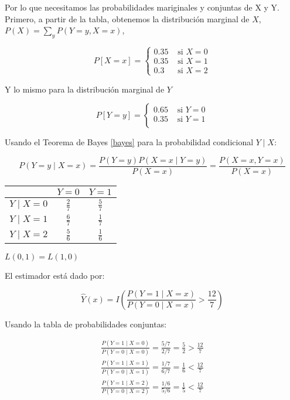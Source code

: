 \documentclass[letter, 11pt, twoside]{report}
\begin{document}
Por lo que necesitamos las probabilidades mariginales y conjuntas de X y Y.
Primero, a partir de la tabla, obtenemos la distribución marginal de $X$, $P(X)=\sum_{y}P(Y=y,X=x)$, 


    $$
    P[X=x]=\left\{\begin{array}{cc}
    0.35 & \text { si } X=0 \\
    0.35 & \text { si } X=1 \\
    0.3 & \text { si } X=2
    \end{array}\right.
    $$

Y lo mismo para la distribución marginal de $Y$

    $$
    P[Y=y]=\left\{\begin{array}{cc}
    0.65 & \text { si }Y=0 \\
    0.35 & \text { si }Y=1 \\
    \end{array}\right.
    $$

Usando el Teorema de Bayes \ref{bayes} para la probabilidad condicional $Y \mid X$:
    
    \begin{equation}
        P(Y=y \mid X=x)=\frac{P(Y=y) P(X=x \mid Y=y)}{P(X=x)}=\frac{P(X=x, Y=x)}{P(X=x)}
        \label{bayes}
    \end{equation}
    

    \begin{tabular}{c| c c}
     & $Y=0$ & $Y=1$ \\
    \hline$Y \mid X=0$ & $\frac{2}{7}$ & $\frac{5}{7}$ \\
    \hline$Y \mid X=1$ & $\frac{6}{7}$ & $\frac{1}{7}$ \\
    \hline$Y \mid X=2$ & $\frac{5}{6}$ & $\frac{1}{6}$ \\
    \end{tabular}

    {\color{mirosa} $L(0,1)=L(1,0)$}
    
    El estimador está dado por:

    \begin{equation}
        \widehat{Y}(x)=I\left(\frac{P(Y=1 \mid X=x)}{P(Y=0 \mid X=x)}>\frac{12}{7}\right) 
    \end{equation}

    Usando la tabla de probabilidades conjuntas:
    
    $$
    \begin{gathered}
    \frac{P(Y=1 \mid X=0)}{P(Y=0 \mid X=0)}=\frac{5 / 7}{2 / 7}=\frac{5}{2}> \frac{12}{7}\\
    \frac{P(Y=1 \mid X=1)}{P(Y=0 \mid X=1)}=\frac{1 / 7}{6 / 7}=\frac{1}{6}< \frac{12}{7}\\
    \frac{P(Y=1 \mid X=2)}{P(Y=0 \mid X=2)}=\frac{1 / 6}{5 / 6}=\frac{1}{5}< \frac{12}{7}
    \end{gathered}
    $$
\end{document}
